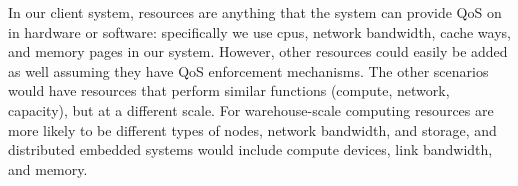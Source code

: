 In our client system, resources are anything that the system can provide QoS on in hardware or software: specifically we use cpus, network bandwidth, cache ways, and memory pages in our system.  However, other resources could easily be added as well assuming they have QoS enforcement mechanisms.  The other scenarios would have resources that perform similar functions (compute, network, capacity), but at a different scale. For warehouse-scale computing resources are more likely to be different types of nodes, network bandwidth, and storage, and distributed embedded systems would include compute devices, link bandwidth, and memory. 

